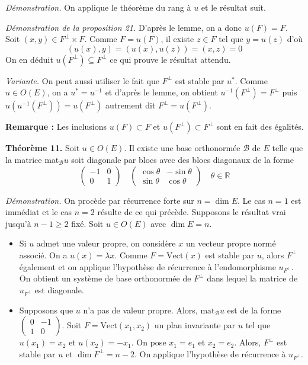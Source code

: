 \textit{Démonstration.} On applique le théorème du rang à $u$ et le résultat suit.

\textit{Démonstration de la proposition 21.} D'après le lemme, on a donc $u(F) = F$. Soit $(x, y) \in F^\perp \times F$. Comme $F = u(F)$, il existe $z \in F$ tel que $y = u(z)$ d'où
\[ (u(x), y) = (u(x), u(z)) = (x, z) = 0 \]
On en déduit $u(F^\perp) \subseteq F^\perp$ ce qui prouve le résultat attendu.

\textit{Variante.} On peut aussi utiliser le fait que $F^\perp$ est stable par $u^\ast$. Comme $u \in O(E)$, on a $u^\ast = u^{-1}$ et d'après le lemme, on obtient $u^{-1}(F^\perp) = F^\perp$ puis $u(u^{-1}(F^\perp)) = u(F^\perp)$ autrement dit $F^\perp = u(F^\perp)$.

\textbf{Remarque :} Les inclusions $u(F) \subset F$ et $u(F^\perp) \subset F^\perp$ sont en fait des égalités.

\textbf{Théorème 11.} Soit $u \in O(E)$. Il existe une base orthonormée $\mathcal{B}$ de $E$ telle que la matrice mat$_\mathcal{B} u$ soit diagonale par blocs avec des blocs diagonaux de la forme
\[ \begin{pmatrix} -1 & 0 \\ 0 & 1 \end{pmatrix} \quad \begin{pmatrix} \cos \theta & -\sin \theta \\ \sin \theta & \cos \theta \end{pmatrix} \quad \theta \in \mathbb{R} \]

\textit{Démonstration.} On procède par récurrence forte sur $n = \dim E$. Le cas $n = 1$ est immédiat et le cas $n = 2$ résulte de ce qui précède. Supposons le résultat vrai jusqu'à $n - 1 \geq 2$ fixé. Soit $u \in O(E)$ avec $\dim E = n$.

\begin{itemize}
    \item Si $u$ admet une valeur propre, on considère $x$ un vecteur propre normé associé. On a $u(x) = \lambda x$. Comme $F = \text{Vect}(x)$ est stable par $u$, alors $F^\perp$ également et on applique l'hypothèse de récurrence à l'endomorphisme $u_{F^\perp}$. On obtient un système de base orthonormée de $F^\perp$ dans lequel la matrice de $u_{F^\perp}$ est diagonale.
    \item Supposons que $u$ n'a pas de valeur propre. Alors, $\text{mat}_\mathcal{B} u$ est de la forme $\begin{pmatrix} 0 & -1 \\ 1 & 0 \end{pmatrix}$. Soit $F = \text{Vect}(x_1, x_2)$ un plan invariante par $u$ tel que $u(x_1) = x_2$ et $u(x_2) = -x_1$. On pose $x_1 = e_1$ et $x_2 = e_2$. Alors, $F^\perp$ est stable par $u$ et $\dim F^\perp = n - 2$. On applique l'hypothèse de récurrence à $u_{F^\perp}$.
\end{itemize}

